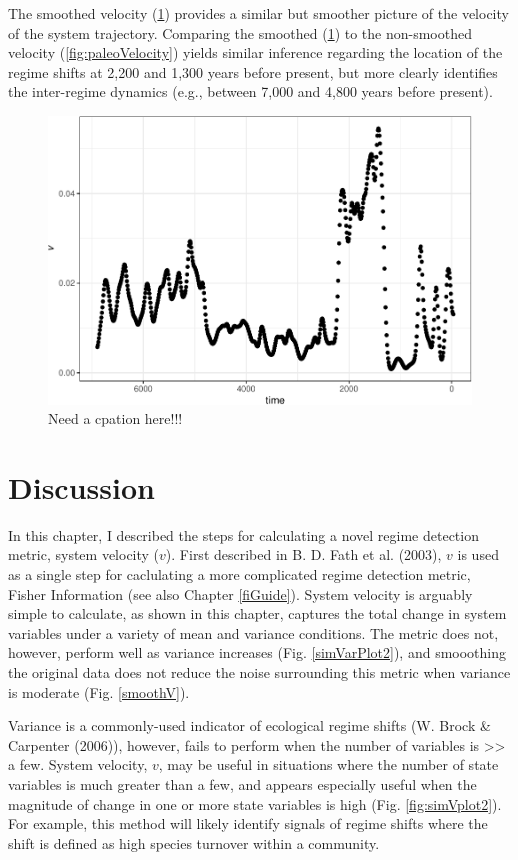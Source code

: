 \documentclass[12pt,twoside,openany]{reedthesis}
\begin{document}
The smoothed velocity (\ref{fig:paleoV}) provides a similar but smoother
picture of the velocity of the system trajectory. Comparing the smoothed
(\ref{fig:paleoV}) to the non-smoothed velocity
(\ref{fig:paleoVelocity}) yields similar inference regarding the
location of the regime shifts at 2,200 and 1,300 years before present,
but more clearly identifies the inter-regime dynamics (e.g., between
7,000 and 4,800 years before present).
\begin{figure}
\centering
\includegraphics{_myDissertation_files/figure-latex/paleoV-1.pdf}
\caption{\label{fig:paleoV}Need a cpation here!!!}
\end{figure}
\section{Discussion}\label{discussion-2}

In this chapter, I described the steps for calculating a novel regime
detection metric, system velocity (\(v\)). First described in B. D. Fath
et al. (2003), \(v\) is used as a single step for caclulating a more
complicated regime detection metric, Fisher Information (see also
Chapter \ref{fiGuide}). System velocity is arguably simple to calculate,
as shown in this chapter, captures the total change in system variables
under a variety of mean and variance conditions. The metric does not,
however, perform well as variance increases (Fig. \ref{simVarPlot2}),
and smooothing the original data does not reduce the noise surrounding
this metric when variance is moderate (Fig. \ref{smoothV}).

Variance is a commonly-used indicator of ecological regime shifts (W.
Brock \& Carpenter (2006)), however, fails to perform when the number of
variables is \textgreater{}\textgreater{} a few. System velocity, \(v\),
may be useful in situations where the number of state variables is much
greater than a few, and appears especially useful when the magnitude of
change in one or more state variables is high (Fig.
\ref{fig:simVplot2}). For example, this method will likely identify
signals of regime shifts where the shift is defined as high species
turnover within a community.
\end{document}
